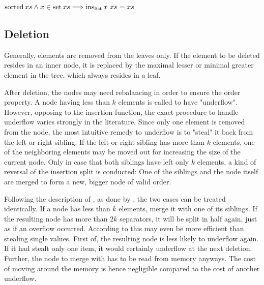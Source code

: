 \begin{lemma}
    $\operatorname{sorted} xs \wedge x \in \operatorname{set} xs \Longrightarrow \operatorname{ins_{list}} x\ xs = xs$
\end{lemma}


\subsection{Deletion}

Generally, elements are removed from the leaves only.
If the element to be deleted resides in an inner node,
it is replaced by the maximal lesser or minimal greater
element in the tree, which always resides in a leaf.

After deletion, the nodes may need rebalancing in order
to ensure the order property.
A node having less than $k$ elements is called to have "underflow".
However, opposing to the insertion function,
the exact procedure to handle underflow varies strongly in the literature.
Since only one element is removed from the node,
the most intuitive remedy to underflow is to "steal" it back
from the left or right sibling.\parencite{DBLP:books/daglib/0023376}
If the left or right sibling has more than $k$ elements,
one of the neighboring elements may be moved out for increasing
the size of the current node.
Only in case that both siblings have left only $k$ elements,
a kind of reversal of the insertion split is conducted:
One of the siblings and the node itself are merged to form
a new, bigger node of valid order.

Following the description of \parencite{DBLP:journals/acta/BayerM72},
as done by \parencite{Fielding80},
the two cases can be treated identically.
If a node has less than $k$ elements,
merge it with one of its siblings.
If the resulting node has more than $2k$ separators,
it will be split in half again, just as if an overflow occurred.
According to \parencite{DBLP:journals/csur/Comer79} this may even be more efficient than stealing single values.
First of, the resulting node is less likely to underflow again.
If it had stealt only one item, it would certainly underflow at the next
deletion.
Further, the node to merge with has to be read from memory anyways.
The cost of moving around the memory
is hence negligible compared to the cost of another underflow.


